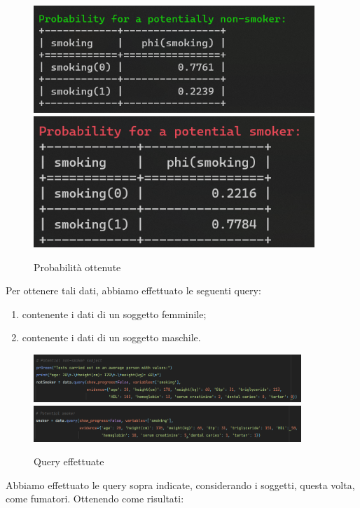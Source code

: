\documentclass{article}
\begin{document}
\begin{figure}[H]
        \includegraphics[width=10.6cm]{imagePNS}
        \includegraphics[width=10.6cm]{imagePS}
        \centering
        \caption{Probabilità ottenute}
        \centering
\end{figure}

Per ottenere tali dati, abbiamo effettuato le seguenti query:
\begin{enumerate}
    \item contenente i dati di un soggetto femminile;
    \item contenente i dati di un soggetto maschile.
\end{enumerate}
\begin{figure}[H]
        \includegraphics[width=0.9\textwidth]{query1}
        \includegraphics[width=0.9\textwidth]{query2}
        \centering
        \caption{Query effettuate}
        \centering
\end{figure}
%

Abbiamo effettuato le query sopra indicate, considerando i soggetti, questa volta, come fumatori.
Ottenendo come risultati:
\end{document}
